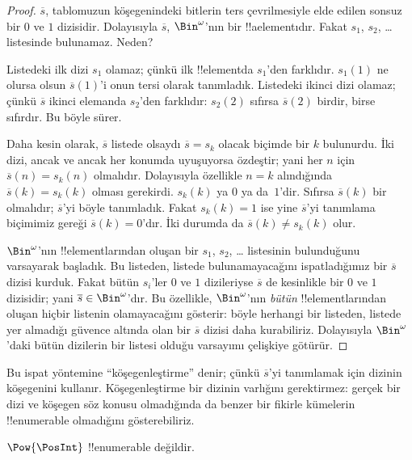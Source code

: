 \documentclass[../../../include/open-logic-section]{subfiles}
\begin{document}
\begin{proof}
$\overline{s}$, tablomuzun köşegenindeki bitlerin ters çevrilmesiyle elde
edilen sonsuz bir $0$ ve $1$ dizisidir. Dolayısıyla $\overline{s}$,
$\Bin^\omega$'nın bir !!a{element}ıdır. Fakat $s_1$,
$s_2$, \dots{} listesinde bulunamaz. Neden?

Listedeki ilk dizi $s_1$ olamaz; çünkü ilk !!{element}da $s_1$'den farklıdır.
$s_1(1)$ ne olursa olsun $\overline{s}(1)$'i onun tersi olarak tanımladık.
Listedeki ikinci dizi olamaz; çünkü $\overline{s}$ ikinci elemanda $s_2$'den
farklıdır: $s_2(2)$ sıfırsa $\overline{s}(2)$ birdir, birse sıfırdır. Bu
böyle sürer.

Daha kesin olarak, $\overline{s}$ listede olsaydı $\overline{s}=s_k$ olacak
biçimde bir $k$ bulunurdu. İki dizi, ancak ve ancak her konumda uyuşuyorsa
özdeştir; yani her $n$ için $\overline{s}(n)=s_k(n)$ olmalıdır. Dolayısıyla
özellikle $n=k$ alındığında $\overline{s}(k)=s_k(k)$ olması gerekirdi.
$s_k(k)$ ya $0$ ya da~$1$'dir. Sıfırsa $\overline{s}(k)$ bir olmalıdır;
$\overline{s}$'yi böyle tanımladık. Fakat $s_k(k)=1$ ise yine
$\overline{s}$'yi tanımlama biçimimiz gereği $\overline{s}(k)=0$'dır. İki
durumda da $\overline{s}(k)\neq s_k(k)$ olur.

$\Bin^\omega$'nın !!{element}larından oluşan bir $s_1$, $s_2$, \dots{}
listesinin bulunduğunu varsayarak başladık. Bu listeden, listede
bulunamayacağını ispatladığımız bir $\overline{s}$ dizisi kurduk. Fakat bütün
$s_i$'ler $0$ ve $1$ dizileriyse $\overline{s}$ de kesinlikle bir $0$ ve
$1$ dizisidir; yani $\overline{s}\in\Bin^\omega$'dır. Bu özellikle,
$\Bin^\omega$'nın \emph{bütün} !!{element}larından oluşan hiçbir listenin
olamayacağını gösterir: böyle herhangi bir listeden, listede yer almadığı
güvence altında olan bir $\overline{s}$ dizisi daha kurabiliriz. Dolayısıyla
$\Bin^\omega$'daki bütün dizilerin bir listesi olduğu varsayımı çelişkiye
götürür.
\end{proof}

\begin{explain}
Bu ispat yöntemine ``köşegenleştirme'' denir; çünkü $\overline{s}$'yi
tanımlamak için dizinin köşegenini kullanır. Köşegenleştirme bir dizinin
varlığını gerektirmez: gerçek bir dizi ve köşegen söz konusu olmadığında da
benzer bir fikirle kümelerin !!{enumerable} olmadığını gösterebiliriz.
\end{explain}

\begin{thm}
$\Pow{\PosInt}$ !!{enumerable} değildir.
\end{thm}
\end{document}
